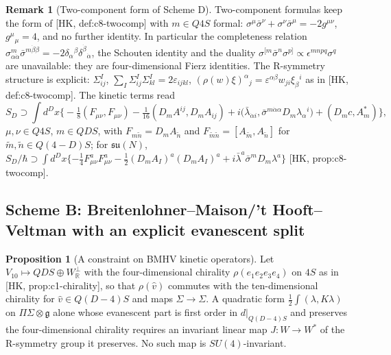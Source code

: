 \documentclass[11pt]{article}
\theoremstyle{definition}
\newtheorem{proposition}[definition]{Proposition}
\newtheorem{remark}[definition]{Remark}
\numberwithin{equation}{section}
\begin{document}
\begin{remark}[Two-component form of Scheme D]
\label{rem:D2c}
Two-component formulas keep the form of [HK, def:c8-twocomp] with $m\in Q4S$ formal: $\sigma^\mu\bar\sigma^\nu+\sigma^\nu\bar\sigma^\mu=-2g^{\mu\nu}$, $g^\mu{}_\mu=4$, and no further identity. In particular the completeness relation $\sigma^m_{\alpha\dot\alpha}\bar\sigma^{m\dot\beta\beta}=-2\delta_\alpha{}^\beta\delta^{\dot\beta}{}_{\dot\alpha}$, the Schouten identity and the duality $\sigma^{[m}\bar\sigma^n\sigma^{p]}\propto\epsilon^{mnpq}\sigma^q$ are unavailable: they are four-dimensional Fierz identities. The R-symmetry structure is explicit: $\Sigma^I_{ij}$, $\sum_I\Sigma^I_{ij}\Sigma^I_{kl}=2\varepsilon_{ijkl}$, $(\rho(w)\xi)^\alpha{}_j=\varepsilon^{\alpha\beta}w_{ji}\xi_\beta{}^i$ as in [HK, def:c8-twocomp]. The kinetic terms read
\[
S_D\supset\int d^Dx\Big\{-\tfrac18(F_{\mu\nu},F_{\mu\nu})-\tfrac1{16}(D_mA^{ij},D_mA_{ij})+i\big(\bar\lambda_{\dot\alpha i},\bar\sigma^{m\dot\alpha\alpha}D_m\lambda_\alpha{}^i\big)+(D_mc,A^*_m)\Big\},
\]
$\mu,\nu\in Q4S$, $m\in QDS$,
with $F_{m\tilde n}=D_mA_{\tilde n}$ and $F_{\tilde m\tilde n}=[A_{\tilde m},A_{\tilde n}]$ for $\tilde m,\tilde n\in Q(4{-}D)S$; for $\mathfrak{su}(N)$, $S_D/\hbar\supset\int d^Dx\{-\frac14F^a_{\mu\nu}F^a_{\mu\nu}-\frac12(D_mA_I)^a(D_mA_I)^a+i\bar\lambda^a\bar\sigma^mD_m\lambda^a\}$ [HK, prop:c8-twocomp].
\end{remark}

\subsection{Scheme B: Breitenlohner--Maison/'t Hooft--Veltman with an explicit evanescent split}

\begin{proposition}[A constraint on BMHV kinetic operators]
\label{prop:nogo}
Let $V_{10}\mapsto QDS\oplus W^\perp_{\mathbb R}$ with the four-dimensional chirality $\rho(e_1e_2e_3e_4)$ on $4S$ as in [HK, prop:c1-chirality], so that $\rho(\hat v)$ commutes with the ten-dimensional chirality for $\hat v\in Q(D{-}4)S$ and maps $\Sigma\to\Sigma$. A quadratic form $\frac12\int(\lambda,K\lambda)$ on $\Pi\Sigma\otimes\mathfrak g$ alone whose evanescent part is first order in $d|_{Q(D-4)S}$ and preserves the four-dimensional chirality requires an invariant linear map $J\colon W\to W^*$ of the R-symmetry group it preserves. No such map is $SU(4)$-invariant.
\end{proposition}
\end{document}
